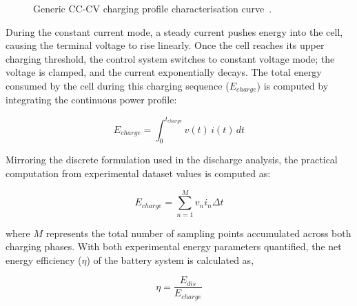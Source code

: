 \begin{figure}[H]
    \caption{Generic \ac{CC-CV} charging profile characterisation curve~\cite{CCCVcurve}.\protect\footnotemark}
    \label{fig:cccv_profile}
\end{figure}

During the constant current mode, a steady current pushes energy into the cell, causing the terminal voltage to rise linearly. 
Once the cell reaches its upper charging threshold, the control system switches to constant voltage mode; the voltage is clamped, 
and the current exponentially decays. The total energy consumed by the cell during this charging sequence ($E_{charge}$) 
is computed by integrating the continuous power profile:

\begin{equation}
    E_{charge} = \int_{0}^{t_{charge}} v(t)\, i(t) \, dt
    \label{eq:Echarge}
\end{equation}

Mirroring the discrete formulation used in the discharge analysis, 
the practical computation from experimental dataset values is computed as:

\begin{equation}
    E_{charge} = \sum_{n=1}^{M} v_n i_n \Delta t
    \label{eq:EchargeDiscrete}
\end{equation}

\noindent where $M$ represents the total number of sampling points accumulated across both charging phases. 
With both experimental energy parameters quantified, the net energy efficiency ($\eta$) of the battery system 
is calculated as,

\begin{equation}
    \eta = \frac{E_{dis}}{E_{charge}}
\end{equation}

